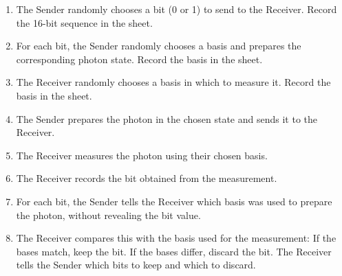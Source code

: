 \documentclass{beamer}
\begin{document}
\begin{frame}
    \begin{enumerate}
        \item<3-> The Sender randomly chooses a bit (0 or 1) to send to the Receiver. Record the 16-bit sequence in the sheet.
        \item<4-> For each bit, the Sender randomly chooses a basis and prepares the corresponding photon state. Record the basis in the sheet.
        \item<5-> The Receiver randomly chooses a basis in which to measure it. Record the basis in the sheet.
        \item<6-> The Sender prepares the photon in the chosen state and sends it to the Receiver.
        \item<7-> The Receiver measures the photon using their chosen basis.
        \item<8-> The Receiver records the bit obtained from the measurement.
        \item<10-> For each bit, the Sender tells the Receiver which basis was used to prepare the photon, without revealing the bit value.
        \item<11-> The Receiver compares this with the basis used for the measurement: If the bases match, keep the bit. If the bases differ, discard the bit. The Receiver tells the Sender which bits to keep and which to discard.
    \end{enumerate}

\end{frame}
\end{document}
